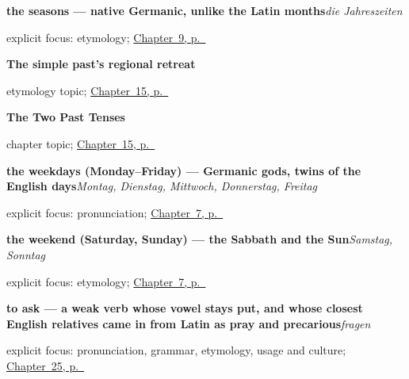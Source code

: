\noindent\begin{minipage}[t]{\linewidth}
\raggedright
\textbf{the seasons — native Germanic, unlike the Latin months}\enspace\emph{die Jahreszeiten}\par
\footnotesize explicit focus: etymology; \hyperref[ch:months-seasons]{Chapter~9, p.~\pageref*{ch:months-seasons}}
\end{minipage}\par\smallskip

\noindent\begin{minipage}[t]{\linewidth}
\raggedright
\textbf{The simple past’s regional retreat}\par
\footnotesize etymology topic; \hyperref[ch:perfekt]{Chapter~15, p.~\pageref*{ch:perfekt}}
\end{minipage}\par\smallskip

\noindent\begin{minipage}[t]{\linewidth}
\raggedright
\textbf{The Two Past Tenses}\par
\footnotesize chapter topic; \hyperref[ch:perfekt]{Chapter~15, p.~\pageref*{ch:perfekt}}
\end{minipage}\par\smallskip

\noindent\begin{minipage}[t]{\linewidth}
\raggedright
\textbf{the weekdays (Monday–Friday) — Germanic gods, twins of the English days}\enspace\emph{Montag, Dienstag, Mittwoch, Donnerstag, Freitag}\par
\footnotesize explicit focus: pronunciation; \hyperref[ch:days]{Chapter~7, p.~\pageref*{ch:days}}
\end{minipage}\par\smallskip

\noindent\begin{minipage}[t]{\linewidth}
\raggedright
\textbf{the weekend (Saturday, Sunday) — the Sabbath and the Sun}\enspace\emph{Samstag, Sonntag}\par
\footnotesize explicit focus: etymology; \hyperref[ch:days]{Chapter~7, p.~\pageref*{ch:days}}
\end{minipage}\par\smallskip

\noindent\begin{minipage}[t]{\linewidth}
\raggedright
\textbf{to ask — a weak verb whose vowel stays put, and whose closest English relatives came in from Latin as pray and precarious}\enspace\emph{fragen}\par
\footnotesize explicit focus: pronunciation, grammar, etymology, usage and culture; \hyperref[ch:ge-doing-verbs]{Chapter~25, p.~\pageref*{ch:ge-doing-verbs}}
\end{minipage}\par\smallskip

